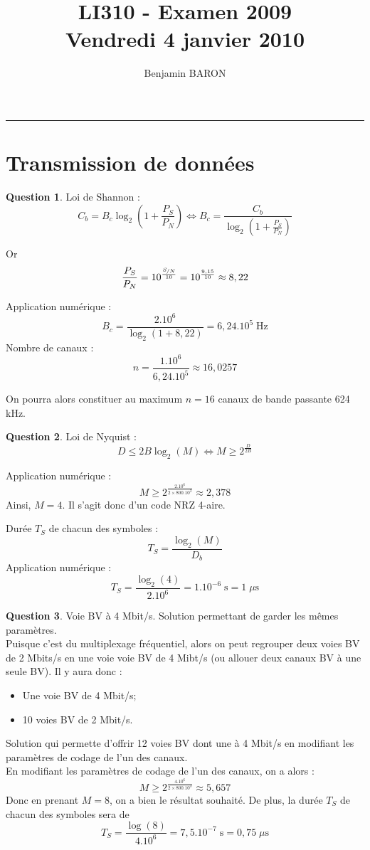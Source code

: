 \documentclass[11pt,english,french]{scrreprt}
\makeatletter
\theoremstyle{remark}
\theoremstyle{definition}
\newtheorem{ques}{Question}[section]
\renewcommand{\maketitle}{\begingroup%
    \let\footnotesize\small
    \let\footnoterule\relax
    \parindent \z@
    \reset@font
    \begin{flushleft}
      \huge \sffamily \bfseries\color{orange} \@title
    \end{flushleft}
    \hrule height 1pt
    \begin{flushright}
      \large\sffamily\color{MyDarkBlue}\@author
    \end{flushright}
  \endgroup%
  \setcounter{footnote}{0}%
}
\makeatother
\begin{document}
	
\title{LI310 - Examen 2009\\
Vendredi 4 janvier 2010}
\author{Benjamin BARON}

\maketitle

\section{Transmission de données} %

\begin{ques}
	Loi de Shannon :
	\[
		C_b = B_c\log_2(1+\frac{P_S}{P_N})\Leftrightarrow B_c = \frac{C_b}{\log_2(1+\frac{P_S}{P_N})}
	\]

	Or \[\frac{P_S}{P_N}=10^{\frac{\nicefrac{S}{N}}{10}}=10^{\frac{9,15}{10}}\approx 8,22\]

	Application numérique : \[B_c=\frac{2.10^6}{\log_2(1+8,22)}=6,24.10^5 \;\textrm{Hz}\]
	Nombre de canaux : \[n=\frac{1.10^6}{6,24.10^5}\approx 16,0257\]

	On pourra alors constituer au maximum $n=16$ canaux de bande passante 624 kHz.
\end{ques}

\begin{ques}
	Loi de Nyquist :\[D\leqslant 2B\log_2(M)\Leftrightarrow M\geqslant 2^{\frac{D}{2B}}\]
	
	Application numérique : \[M\geqslant 2^{\frac{2.10^6}{2\times 800.10^3}}\approx 2,378\]
	Ainsi, $M=4$. Il s'agit donc d'un code NRZ 4-aire.
	
	Durée $T_S$ de chacun des symboles : \[T_S = \frac{\log_2(M)}{D_b}\]
	Application numérique : \[T_S = \frac{\log_2(4)}{2.10^6}=1.10^{-6}\;\textrm{s} = 1\;\mu\textrm{s}\]
\end{ques}

\begin{ques}
	Voie BV à 4 Mbit/s. Solution permettant de garder les mêmes paramètres.\\
	Puisque c'est du multiplexage fréquentiel, alors on peut regrouper deux voies BV de 2 Mbits/s en une voie voie BV de 4 Mibt/s (ou allouer deux canaux BV à une seule BV). Il y aura donc : \begin{itemize}
		\item Une voie BV de 4 Mbit/s;
		\item 10 voies BV de 2 Mbit/s.
	\end{itemize}
	
	Solution qui permette d'offrir 12 voies BV dont une à 4 Mbit/s en modifiant les paramètres de codage de l'un des canaux.\\
	En modifiant les paramètres de codage de l'un des canaux, on a alors :\[M\geqslant 2^{\frac{4.10^6}{2\times 800.10^3}}\approx 5,657\]
	Donc en prenant $M=8$, on a bien le résultat souhaité. De plus, la durée $T_S$ de chacun des symboles sera de \[T_S=\frac{\log(8)}{4.10^6} = 7,5.10^{-7}\;\textrm{s}=0,75\;\mu\textrm{s}\]
\end{ques}
\end{document}
